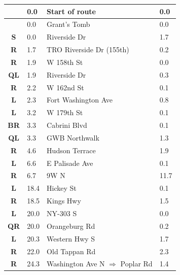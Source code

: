 \documentclass[11pt]{article}
\begin{document}
\renewcommand{\arraystretch}{1.15}
\twocolumn
{}
\tabletail{\hline}
\tablelasttail{\hline}
\begin{center}
  \begin{supertabular}{|c|p{0.30in}|p{2.25in}|l|}
  \hline
{} \textbf{} &   0.0 & Start of route &   0.0 \\ \hline
{} \textbf{} &   0.0 & Grant's Tomb &   0.0 \\ \hline
 \textbf{S} &   0.0 & Riverside Dr &   1.7 \\ \hline
{} \textbf{R} &   1.7 & TRO Riverside Dr (155th) &   0.2 \\ \hline
{} \textbf{R} &   1.9 & W 158th St &   0.0 \\ \hline
 \textbf{QL} &   1.9 & Riverside Dr &   0.3 \\ \hline
{} \textbf{R} &   2.2 & W 162nd St &   0.1 \\ \hline
 \textbf{L} &   2.3 & Fort Washington Ave &   0.8 \\ \hline
 \textbf{L} &   3.2 & W 179th St &   0.1 \\ \hline
{} \textbf{BR} &   3.3 & Cabrini Blvd &   0.1 \\ \hline
 \textbf{QL} &   3.3 & GWB Northwalk &   1.3 \\ \hline
{} \textbf{R} &   4.6 & Hudson Terrace &   1.9 \\ \hline
 \textbf{L} &   6.6 & E Palisade Ave &   0.1 \\ \hline
{} \textbf{R} &   6.7 & 9W N &  11.7 \\ \hline
 \textbf{L} &  18.4 & Hickey St &   0.1 \\ \hline
{} \textbf{R} &  18.5 & Kings Hwy &   1.5 \\ \hline
 \textbf{L} &  20.0 & NY-303 S &   0.0 \\ \hline
{} \textbf{QR} &  20.0 & Orangeburg Rd &   0.2 \\ \hline
 \textbf{L} &  20.3 & Western Hwy S &   1.7 \\ \hline
{} \textbf{R} &  22.0 & Old Tappan Rd &   2.3 \\ \hline
{} \textbf{R} &  24.3 & Washington Ave N $\Rightarrow$ Poplar Rd &   1.4 \\ \hline

\end{supertabular}
\end{center}
\end{document}

